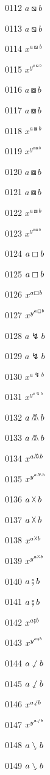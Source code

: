 \documentclass{article}
\begin{document}
0112 $a\boxbslash b$\par
0113 $\displaystyle a\boxbslash b$\par
0114 $x^{a\boxbslash b}$\par
0115 $x^{y^{a\boxbslash b}}$\par
0116 $a\boxcircle b$\par
0117 $\displaystyle a\boxcircle b$\par
0118 $x^{a\boxcircle b}$\par
0119 $x^{y^{a\boxcircle b}}$\par
0120 $a\boxbox b$\par
0121 $\displaystyle a\boxbox b$\par
0122 $x^{a\boxbox b}$\par
0123 $x^{y^{a\boxbox b}}$\par
0124 $a\boxempty b$\par
0125 $\displaystyle a\boxempty b$\par
0126 $x^{a\boxempty b}$\par
0127 $x^{y^{a\boxempty b}}$\par
0128 $a\lightning b$\par
0129 $\displaystyle a\lightning b$\par
0130 $x^{a\lightning b}$\par
0131 $x^{y^{a\lightning b}}$\par
0132 $a\merge b$\par
0133 $\displaystyle a\merge b$\par
0134 $x^{a\merge b}$\par
0135 $x^{y^{a\merge b}}$\par
0136 $a\vartimes b$\par
0137 $\displaystyle a\vartimes b$\par
0138 $x^{a\vartimes b}$\par
0139 $x^{y^{a\vartimes b}}$\par
0140 $a\fatsemi b$\par
0141 $\displaystyle a\fatsemi b$\par
0142 $x^{a\fatsemi b}$\par
0143 $x^{y^{a\fatsemi b}}$\par
0144 $a\sswarrow b$\par
0145 $\displaystyle a\sswarrow b$\par
0146 $x^{a\sswarrow b}$\par
0147 $x^{y^{a\sswarrow b}}$\par
0148 $a\ssearrow b$\par
0149 $\displaystyle a\ssearrow b$\par
\end{document}
